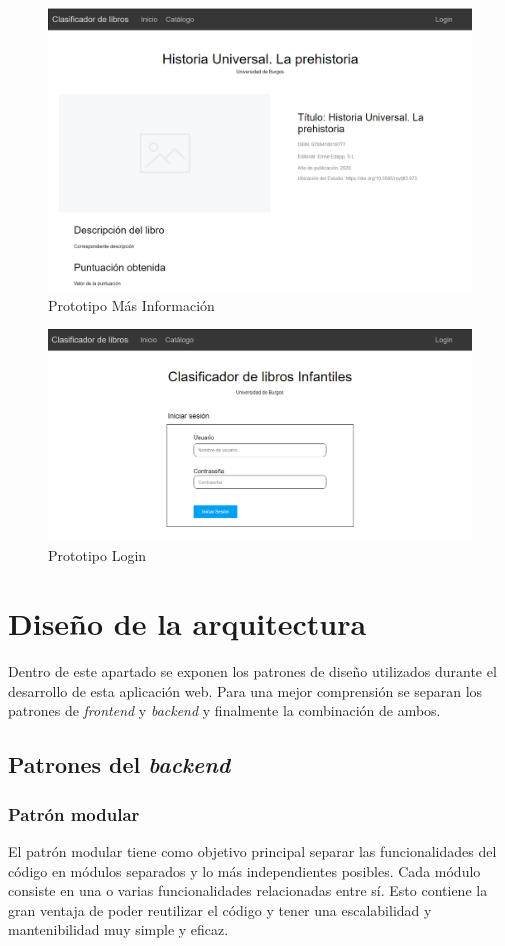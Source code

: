\begin{figure}[htbp]
    \centering
    \includegraphics[width=0.9\linewidth]{Imagenes/PrototipoMasInfo.png}
    \caption{Prototipo Más Información}
    \label{Prototipo Más Información}
\end{figure}
\begin{figure}
    \centering
    \includegraphics[width=0.9\linewidth]{Imagenes/PrototipoLogin.png}
    \caption{Prototipo Login}
    \label{Prototipo Login}
\end{figure}
\FloatBarrier

\section{Diseño de la arquitectura}
Dentro de este apartado se exponen los patrones de diseño utilizados durante el desarrollo de esta aplicación web. Para una mejor comprensión se separan los patrones de \textit{frontend} y \textit{backend} y finalmente la combinación de ambos.
\subsection{ Patrones del \textit{backend}}
\subsubsection{Patrón modular~\cite{PatrónMódulo}}
El patrón modular tiene como objetivo principal separar las funcionalidades del código en módulos separados y lo más independientes posibles. Cada módulo consiste en una o varias funcionalidades relacionadas entre sí. Esto contiene la gran ventaja de poder reutilizar el código y tener una escalabilidad y mantenibilidad muy simple y eficaz.

